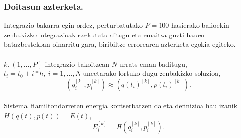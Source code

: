 \subsubsection{Doitasun azterketa.}

Integrazio bakarra egin ordez, perturbatutako $P=100$ hasierako balioekin zenbakizko integrazioak exekutatu ditugu eta emaitza guzti hauen batazbestekoan oinarritu gara, biribiltze errorearen azterketa egokia egiteko.    

\paragraph*{}  $ k. \ (1,\dots,P)$ integrazio bakoitzean $N$ urrats eman baditugu, $t_i=t_0+i*h, \ i=1,\dots,N$ uneetarako lortuko dugu 
zenbakizko soluzioa,
\begin{equation*}
(q_i^{[k]},p_i^{[k]})\approx(q(t_i)^{[k]},p(t_i)^{[k]}).
\end{equation*}

\paragraph*{}Sistema Hamiltondarretan energia kontserbatzen da eta  definizioa hau izanik $H(q(t),p(t))=E(t)$,
\begin{equation*}
E_i^{[k]}=H(q_i^{[k]},p_i^{[k]}).
\end{equation*}

